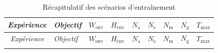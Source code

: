 \begin{longtable}{cp{6cm}ccccccc}

    \caption{Récapitulatif des scénarios d'entraînement} \label{tab:training_scenarios}                                                                                                                                                                \\
    \toprule
    \textit{Expérience} & \textit{Objectif}                                                                               & $W_{\text{env}}$ & $H_{\text{env}}$ & $N_{\text{a}}$ & $N_{\text{s}}$ & $N_{\text{m}}$ & $N_{\text{g}}$ & $T_{\text{max}}$ \\
    \midrule
    \endfirsthead
    \toprule
    \textit{Expérience} & \textit{Objectif}                                                                               & $W_{\text{env}}$ & $H_{\text{env}}$ & $N_{\text{a}}$ & $N_{\text{s}}$ & $N_{\text{m}}$ & $N_{\text{g}}$ & $T_{\text{max}}$ \\
    \midrule
    \endhead
    \midrule
    \endfoot
    \bottomrule
    \endlastfoot


\end{longtable}
